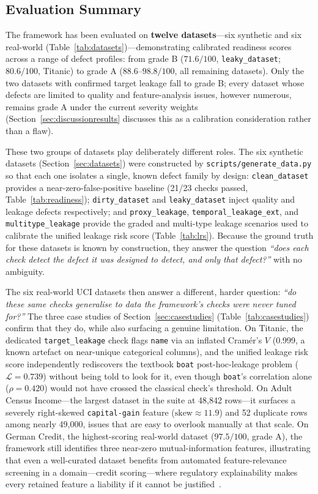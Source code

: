 \documentclass[12pt,a4paper]{report}
\begin{document}
\subsection{Evaluation Summary}

The framework has been evaluated on \textbf{twelve datasets}---six synthetic and six
real-world (Table~\ref{tab:datasets})---demonstrating calibrated readiness scores across a
range of defect profiles: from grade B ($71.6/100$, \texttt{leaky\_dataset}; $80.6/100$,
Titanic) to grade A ($88.6$--$98.8/100$, all remaining datasets).  Only the two datasets
with confirmed target leakage fall to grade B; every dataset whose defects are limited to
quality and feature-analysis issues, however numerous, remains grade A under the current
severity weights (Section~\ref{sec:discussionresults} discusses this as a calibration
consideration rather than a flaw).

These two groups of datasets play deliberately different roles.  The six synthetic datasets
(Section~\ref{sec:datasets}) were constructed by \texttt{scripts/generate\_data.py} so that
each one isolates a single, known defect family by design: \texttt{clean\_dataset} provides a
near-zero-false-positive baseline (21/23 checks passed, Table~\ref{tab:readiness});
\texttt{dirty\_dataset} and \texttt{leaky\_dataset} inject quality and leakage defects
respectively; and \texttt{proxy\_leakage}, \texttt{temporal\_leakage\_ext}, and
\texttt{multitype\_leakage} provide the graded and multi-type leakage scenarios used to
calibrate the unified leakage risk score (Table~\ref{tab:lrs}).  Because the ground truth for
these datasets is known by construction, they answer the question \emph{``does each check
detect the defect it was designed to detect, and only that defect?''} with no ambiguity.

The six real-world UCI datasets then answer a different, harder question: \emph{``do these
same checks generalise to data the framework's checks were never tuned for?''}  The three
case studies of Section~\ref{sec:casestudies} (Table~\ref{tab:casestudies}) confirm that they
do, while also surfacing a genuine limitation.  On Titanic, the dedicated
\texttt{target\_leakage} check flags \texttt{name} via an inflated Cram\'er's $V$ (0.999, a
known artefact on near-unique categorical columns), and the unified leakage risk score
independently rediscovers the textbook \texttt{boat} post-hoc-leakage problem
($\mathcal{L}{=}0.739$) without being told to look for it, even though \texttt{boat}'s
correlation alone ($\rho{=}0.420$) would not have crossed the classical check's threshold.
On Adult Census Income---the largest dataset in the suite at 48,842 rows---it surfaces a
severely right-skewed \texttt{capital-gain} feature ($\text{skew}\approx11.9$) and 52
duplicate rows among nearly 49,000, issues that are easy to overlook manually at that scale.
On German Credit, the highest-scoring real-world dataset ($97.5/100$, grade A), the framework
still identifies three near-zero mutual-information features, illustrating that even a
well-curated dataset benefits from automated feature-relevance screening in a domain---credit
scoring---where regulatory explainability makes every retained feature a liability if it
cannot be justified~\cite{siddiqi2006}.
\end{document}
